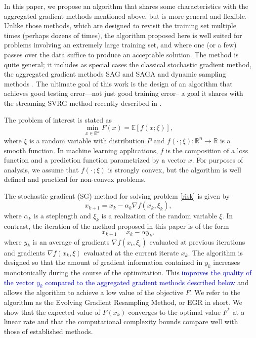 \documentclass[11pt]{article}
\begin{document}
In this paper, we propose an algorithm that shares some characteristics with the aggregated gradient methods mentioned above, but is more general and flexible. Unlike those methods, which are designed to revisit the training set multiple times (perhaps dozens of times), the algorithm proposed here is well suited for problems involving an extremely large training set, and where one (or a few) passes over the data suffice to produce an acceptable solution. The method is quite general; it includes as special cases  the classical stochastic gradient method, the aggregated gradient methods SAG and SAGA  \cite{NIPS2014_5258,mairal2015incremental} and  dynamic sampling methods \cite{dss,FS2011,2014pasglyetal}. The ultimate goal of this work is the design of an algorithm that achieves good testing error---not just good training error-- a goal it shares with the streaming SVRG method recently described in \cite{frostig2014competing}.


The problem of interest is stated as
\begin{equation}  \label{risk}
	\min_{x \in \mathbb{R}^n} F(x) = \mathbb{E}[ f(x;\xi)] ,
\end{equation}
where $\xi$ is a random variable with distribution $P$ and $f(\cdot\,; \xi): \mathbb{R}^n \rightarrow \mathbb{R}$  is a smooth function. In machine learning applications, $f$ is the composition of a  loss function and a prediction function parametrized by a vector $x$. 
For purposes of analysis, we assume that $f(\cdot\,; \xi)$ is strongly convex, but the algorithm is well defined and practical for non-convex problems. 

The stochastic gradient (SG) method for solving problem \eqref{risk} is given by 
\begin{equation}   \label{sgdm}
 x_{k+1} = x_k- \alpha_k  \nabla f(x_k, \xi_k), 
 \end{equation}
where $\alpha_k$ is a steplength and $\xi_k$ is a realization of the random variable $\xi$. In contrast, the iteration of the method proposed in this paper is of the form
\begin{equation}   \label{iteration}
   	 x_{k+1} = x_k  - \alpha  y_k ,
\end{equation}
where $y_k$ is an average of gradients $\nabla f(x_i, \xi_i)$ evaluated at previous iterations and  gradients $\nabla f(x_k, \xi)$ evaluated at the current iterate $x_k$.  The algorithm is designed so that  the amount of gradient information contained in $y_k$ increases monotonically during the course of the optimization.  This \textcolor{blue}{improves the quality of the vector $y_k$ compared to the aggregated gradient methods described below} and allows the algorithm to achieve a low  value of the objective $F$. We refer to the algorithm as the Evolving Gradient Resampling Method, or EGR in short. We show that the expected value of $F(x_k)$ converges to the optimal value  $F^\ast$ at a linear rate and that the computational complexity bounds compare well with those of established methods.  
\end{document}
